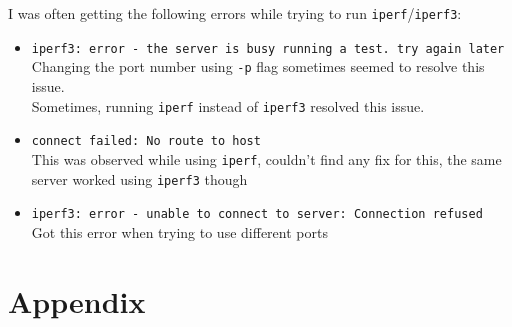 \documentclass[11pt, fleqn]{article}
\begin{document}
I was often getting the following errors while trying to run \texttt{iperf}/\texttt{iperf3}:
\begin{itemize}[itemsep=-0.5ex]

    \item \texttt{iperf3: error - the server is busy running a test. try again later}\\
    Changing the port number using \texttt{-p} flag sometimes seemed to resolve this issue.\\
    Sometimes, running \texttt{iperf} instead of \texttt{iperf3} resolved this issue.
    
    \item \texttt{connect failed: No route to host}\\
    This was observed while using \texttt{iperf}, couldn't find any fix for this, the same server worked using \texttt{iperf3} though
    
    \item \texttt{iperf3: error - unable to connect to server: Connection refused}\\
    Got this error when trying to use different ports
    
\end{itemize}

\newpage
\section*{Appendix}
\setcounter{equation}{0}
\end{document}
